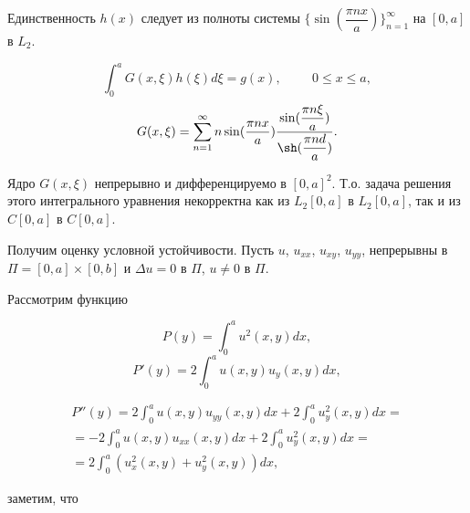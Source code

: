 \documentclass{article}
\begin{document}
Единственность $h(x)$ следует из полноты системы $\{\sin (\dfrac{\pi n x}{a})\}_{n=1}^{\infty}$ на $[0,a]$ в $L_2$.


\[
\int_0^a G(x,\xi) h(\xi) d \xi = g(x), \hspace{1cm} 0 \leqslant x \leqslant a,
\]
\[
G(x,\xi) =  \sum_{n=1}^{\infty} n \sin (\dfrac{\pi n x}{a})  \dfrac{\sin (\dfrac{\pi n \xi}{a})}{\sh (\dfrac{\pi n d}{a})}.
\]

Ядро $G(x,\xi)$ непрерывно и дифференцируемо в $[0,a]^2$. Т.о. задача решения этого интегрального уравнения некорректна как из $L_2[0,a]$ в $L_2[0,a]$, так и из $C[0,a]$ в $C[0,a]$.

Получим оценку условной устойчивости. Пусть $u$, $u_{xx}$, $u_{xy}$, $u_{yy}$, непрерывны в $\Pi = [0,a] \times [0,b]$ и $\Delta u = 0$ в $\Pi$, $u \ne 0$ в $\Pi$.

Рассмотрим функцию

\[
P(y) = \int_0^a u^2 (x,y) dx,
\]
\[
P'(y) = 2 \int_0^a u (x,y) u_y(x,y) dx,
\]

\begin{multline*}
P''(y) = 2 \int_0^a u (x,y) u_{yy}(x,y) dx + 2 \int_0^a u_y^2 (x,y) dx = \\
= -2 \int_0^a u (x,y) u_{xx}(x,y)dx + 2 \int_0^a u_y^2(x,y)dx = \\
=  2 \int_0^a (u_x^2(x,y) + u_y^2(x,y))dx, 
\end{multline*}

заметим, что
\end{document}
